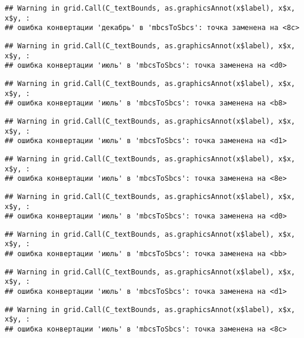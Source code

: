 \documentclass[
]{article}
\begin{document}
\begin{verbatim}
## Warning in grid.Call(C_textBounds, as.graphicsAnnot(x$label), x$x, x$y, :
## ошибка конвертации 'декабрь' в 'mbcsToSbcs': точка заменена на <8c>
\end{verbatim}

\begin{verbatim}
## Warning in grid.Call(C_textBounds, as.graphicsAnnot(x$label), x$x, x$y, :
## ошибка конвертации 'июль' в 'mbcsToSbcs': точка заменена на <d0>
\end{verbatim}

\begin{verbatim}
## Warning in grid.Call(C_textBounds, as.graphicsAnnot(x$label), x$x, x$y, :
## ошибка конвертации 'июль' в 'mbcsToSbcs': точка заменена на <b8>
\end{verbatim}

\begin{verbatim}
## Warning in grid.Call(C_textBounds, as.graphicsAnnot(x$label), x$x, x$y, :
## ошибка конвертации 'июль' в 'mbcsToSbcs': точка заменена на <d1>
\end{verbatim}

\begin{verbatim}
## Warning in grid.Call(C_textBounds, as.graphicsAnnot(x$label), x$x, x$y, :
## ошибка конвертации 'июль' в 'mbcsToSbcs': точка заменена на <8e>
\end{verbatim}

\begin{verbatim}
## Warning in grid.Call(C_textBounds, as.graphicsAnnot(x$label), x$x, x$y, :
## ошибка конвертации 'июль' в 'mbcsToSbcs': точка заменена на <d0>
\end{verbatim}

\begin{verbatim}
## Warning in grid.Call(C_textBounds, as.graphicsAnnot(x$label), x$x, x$y, :
## ошибка конвертации 'июль' в 'mbcsToSbcs': точка заменена на <bb>
\end{verbatim}

\begin{verbatim}
## Warning in grid.Call(C_textBounds, as.graphicsAnnot(x$label), x$x, x$y, :
## ошибка конвертации 'июль' в 'mbcsToSbcs': точка заменена на <d1>
\end{verbatim}

\begin{verbatim}
## Warning in grid.Call(C_textBounds, as.graphicsAnnot(x$label), x$x, x$y, :
## ошибка конвертации 'июль' в 'mbcsToSbcs': точка заменена на <8c>
\end{verbatim}
\end{document}
